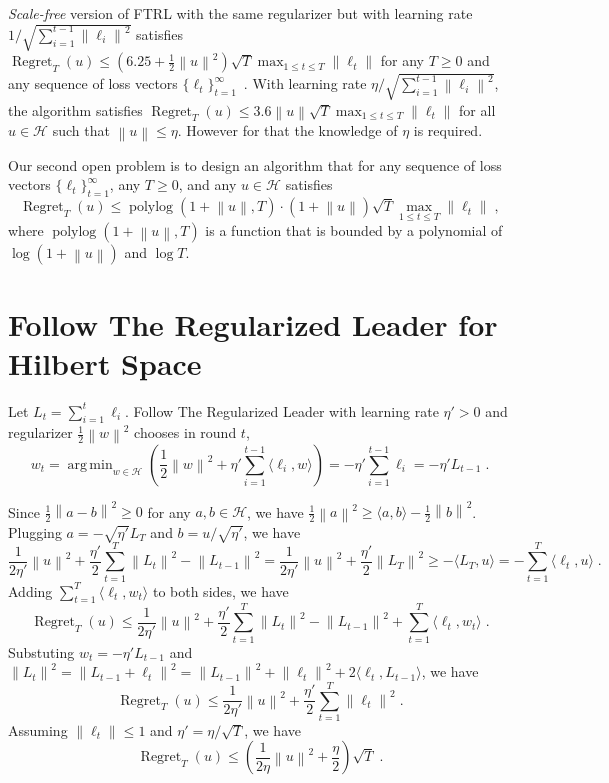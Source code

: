 \documentclass{colt2016} %
\DeclareMathOperator{\Regret}{Regret}
\DeclareMathOperator{\polylog}{polylog}
\renewcommand{\H}{\mathcal{H}}  %
\newcommand{\norm}[1]{\left\|{#1}\right\|}
\DeclareMathOperator*{\argmin}{arg\,min}
\begin{document}
\emph{Scale-free} version of FTRL with the same regularizer but with learning
rate $1/\sqrt{\sum_{i=1}^{t-1} \norm{\ell_i}^2}$ satisfies $\Regret_T(u) \le
(6.25 + \frac{1}{2}\norm{u}^2) \sqrt{T} \max_{1 \le t \le T} \norm{\ell_t}$ for
any $T \ge 0$ and any sequence of loss vectors $\{\ell_t\}_{t=1}^\infty$~\citep{Orabona-Pal-2015}. With learning
rate $\eta/\sqrt{\sum_{i=1}^{t-1} \norm{\ell_i}^2}$, the algorithm satisfies
$\Regret_T(u) \le 3.6 \norm{u} \sqrt{T} \max_{1 \le t \le T} \norm{\ell_t}$ for
all $u \in \H$ such that $\norm{u} \le \eta$. However for that the knowledge
of $\eta$ is required.

Our second open problem is to design an algorithm that for any
sequence of loss vectors $\{\ell_t\}_{t=1}^\infty$, any $T \ge 0$,
and any $u \in \H$ satisfies
$$
\Regret_T(u) \le \polylog(1 + \norm{u}, T) \cdot (1 + \norm{u}) \sqrt{T} \max_{1 \le t \le T} \norm{\ell_t} \; ,
$$
where $\polylog(1 + \norm{u}, T)$ is a function that is bounded by a polynomial
of $\log(1 + \norm{u})$ and $\log T$.



\appendix

\section{Follow The Regularized Leader for Hilbert Space}

Let $L_t = \sum_{i=1}^t \ell_i$.
Follow The Regularized Leader with learning rate $\eta' > 0$ and regularizer $\frac{1}{2}\norm{w}^2$
chooses in round $t$,
$$
w_t
= \argmin_{w \in \H} \left( \frac{1}{2}\norm{w}^2 + \eta' \sum_{i=1}^{t-1} \langle \ell_i, w \rangle \right)
= - \eta' \sum_{i=1}^{t-1} \ell_i = - \eta' L_{t-1} \; .
$$

Since $\frac{1}{2}\norm{a-b}^2 \ge 0$ for any $a,b \in \H$, we have $\frac{1}{2}\norm{a}^2 \ge \langle a, b \rangle - \frac{1}{2}\norm{b}^2$.
Plugging $a = -\sqrt{\eta'} L_T$ and $b = u/\sqrt{\eta'}$, we have
$$
\frac{1}{2\eta'} \norm{u}^2 + \frac{\eta'}{2} \sum_{t=1}^T \norm{L_t}^2 - \norm{L_{t-1}}^2
= \frac{1}{2\eta'} \norm{u}^2 + \frac{\eta'}{2} \norm{L_T}^2  \ge - \langle L_T, u \rangle
= - \sum_{t=1}^T \langle \ell_t, u \rangle  \; .
$$
Adding $\sum_{t=1}^T \langle \ell_t, w_t \rangle$ to both sides, we have
$$
\Regret_T(u) \le \frac{1}{2\eta'} \norm{u}^2 + \frac{\eta'}{2} \sum_{t=1}^T \norm{L_t}^2 - \norm{L_{t-1}}^2 + \sum_{t=1}^T \langle \ell_t, w_t \rangle \; .
$$
Substuting $w_t = -\eta' L_{t-1}$ and $\norm{L_{t}}^2 = \norm{L_{t-1} + \ell_t}^2 = \norm{L_{t-1}}^2 + \norm{\ell_t}^2 + 2 \langle \ell_t, L_{t-1} \rangle$,
we have
$$
\Regret_T(u) \le \frac{1}{2\eta'} \norm{u}^2 + \frac{\eta'}{2} \sum_{t=1}^T \norm{\ell_t}^2 \; .
$$
Assuming $\norm{\ell_t} \le 1$ and $\eta' = \eta/\sqrt{T}$, we have
$$
\Regret_T(u) \le \left(\frac{1}{2\eta} \norm{u}^2 + \frac{\eta}{2} \right) \sqrt{T} \; .
$$
\end{document}
